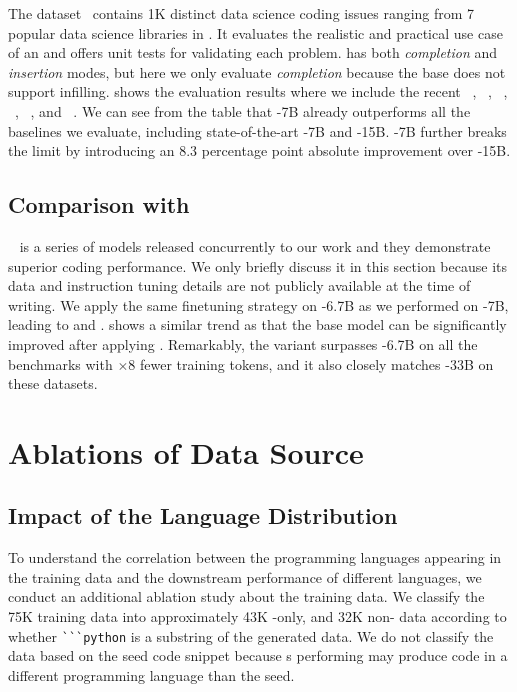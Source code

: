The \dsonek{} dataset~\cite{ds1000} contains 1K distinct data science coding issues ranging from 7 popular data science libraries in \python.
It evaluates the realistic and practical use case of an \llm{} and offers unit tests for validating each problem.
\dsonek{} has both \emph{completion} and \emph{insertion} modes, but here we only evaluate \emph{completion} because the base \codellamapy{} does not support infilling.
 shows the evaluation results where 
we include the recent \incoder~\cite{incoder}, \codegen~\cite{codegen}, \codecush~\cite{codecush}, \starcoder~\cite{starcoder}, \codellamapy~\cite{codellama}, and \wizardcoder~\cite{wizardcoder}.
We can see from the table that \modelc-7B already outperforms all the baselines we evaluate, including state-of-the-art \wizardcoderc-7B and \wizardcodersc-15B. \modelxc{}-7B further breaks the limit by introducing an 8.3 percentage point absolute improvement over \wizardcodersc-15B.

\subsection{Comparison with \dscoder}
\label{sec:comparison-with-dscoder}

\dscoder{}~\cite{dscoder} is a series of models released concurrently to our work and they demonstrate superior coding performance.
We only briefly discuss it in this section because its data and instruction tuning details are not publicly available at the time of writing.
We apply the same finetuning strategy on \dscoderbase-6.7B as we performed on \codellamapy-7B, leading to \modeld{} and \modelxd{}.
 shows a similar trend as  that the base model can be significantly improved after applying \tech{}.
Remarkably, the \modelxd{} variant surpasses \dscoderinst-6.7B on all the benchmarks with $\times$8 fewer training tokens, and it also closely matches \dscoderinst-33B on these datasets.
\section{Ablations of Data Source}
\subsection{Impact of the Language Distribution}

To understand the correlation between the programming languages appearing in the training data and the downstream performance of different languages, we conduct an additional ablation study about the training data.
We classify the 75K training data into approximately 43K \python-only, and 32K non-\python{} data according to whether \verb|```python| is a substring of the generated data.
We do not classify the data based on the seed code snippet because \llm{}s performing \tech{} may produce code in a different programming language than the seed.

